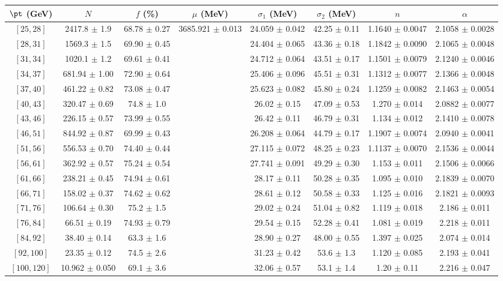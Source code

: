 \begin{tabular}{c||c|c|c|c|c|c|c}
$\pt$ (GeV) & $N$ & $f$ (\%) & $\mu$ (MeV) & $\sigma_1$ (MeV) & $\sigma_2$ (MeV) & $n$ & $\alpha$ \\
\hline
$[25, 28]$ & 2417.8 $\pm$ 1.9 & 68.78 $\pm$ 0.27 & \multirow{17}{*}{3685.921 $\pm$ 0.013} & 24.059 $\pm$ 0.042 & 42.25 $\pm$ 0.11 & 1.1640 $\pm$ 0.0047 & 2.1058 $\pm$ 0.0028\\
$[28, 31]$ & 1569.3 $\pm$ 1.5 & 69.90 $\pm$ 0.45 &  & 24.404 $\pm$ 0.065 & 43.36 $\pm$ 0.18 & 1.1842 $\pm$ 0.0090 & 2.1065 $\pm$ 0.0048\\
$[31, 34]$ & 1020.1 $\pm$ 1.2 & 69.61 $\pm$ 0.41 &  & 24.712 $\pm$ 0.064 & 43.51 $\pm$ 0.17 & 1.1501 $\pm$ 0.0079 & 2.1240 $\pm$ 0.0046\\
$[34, 37]$ & 681.94 $\pm$ 1.00 & 72.90 $\pm$ 0.64 &  & 25.406 $\pm$ 0.096 & 45.51 $\pm$ 0.31 & 1.1312 $\pm$ 0.0077 & 2.1366 $\pm$ 0.0048\\
$[37, 40]$ & 461.22 $\pm$ 0.82 & 73.08 $\pm$ 0.47 &  & 25.623 $\pm$ 0.082 & 45.80 $\pm$ 0.24 & 1.1259 $\pm$ 0.0082 & 2.1463 $\pm$ 0.0054\\
$[40, 43]$ & 320.47 $\pm$ 0.69 & 74.8 $\pm$ 1.0 &  & 26.02 $\pm$ 0.15 & 47.09 $\pm$ 0.53 & 1.270 $\pm$ 0.014 & 2.0882 $\pm$ 0.0077\\
$[43, 46]$ & 226.15 $\pm$ 0.57 & 73.99 $\pm$ 0.55 &  & 26.42 $\pm$ 0.11 & 46.79 $\pm$ 0.31 & 1.134 $\pm$ 0.012 & 2.1410 $\pm$ 0.0078\\
$[46, 51]$ & 844.92 $\pm$ 0.87 & 69.99 $\pm$ 0.43 &  & 26.208 $\pm$ 0.064 & 44.79 $\pm$ 0.17 & 1.1907 $\pm$ 0.0074 & 2.0940 $\pm$ 0.0041\\
$[51, 56]$ & 556.53 $\pm$ 0.70 & 74.40 $\pm$ 0.44 &  & 27.115 $\pm$ 0.072 & 48.25 $\pm$ 0.23 & 1.1137 $\pm$ 0.0070 & 2.1536 $\pm$ 0.0044\\
$[56, 61]$ & 362.92 $\pm$ 0.57 & 75.24 $\pm$ 0.54 &  & 27.741 $\pm$ 0.091 & 49.29 $\pm$ 0.30 & 1.153 $\pm$ 0.011 & 2.1506 $\pm$ 0.0066\\
$[61, 66]$ & 238.21 $\pm$ 0.45 & 74.94 $\pm$ 0.61 &  & 28.17 $\pm$ 0.11 & 50.28 $\pm$ 0.35 & 1.095 $\pm$ 0.010 & 2.1839 $\pm$ 0.0070\\
$[66, 71]$ & 158.02 $\pm$ 0.37 & 74.62 $\pm$ 0.62 &  & 28.61 $\pm$ 0.12 & 50.58 $\pm$ 0.33 & 1.125 $\pm$ 0.016 & 2.1821 $\pm$ 0.0093\\
$[71, 76]$ & 106.64 $\pm$ 0.30 & 75.2 $\pm$ 1.5 &  & 29.02 $\pm$ 0.24 & 51.04 $\pm$ 0.82 & 1.119 $\pm$ 0.018 & 2.186 $\pm$ 0.011\\
$[76, 84]$ & 66.51 $\pm$ 0.19 & 74.93 $\pm$ 0.79 &  & 29.54 $\pm$ 0.15 & 52.28 $\pm$ 0.41 & 1.081 $\pm$ 0.019 & 2.218 $\pm$ 0.011\\
$[84, 92]$ & 38.40 $\pm$ 0.14 & 63.3 $\pm$ 1.6 &  & 28.90 $\pm$ 0.27 & 48.00 $\pm$ 0.55 & 1.397 $\pm$ 0.025 & 2.074 $\pm$ 0.014\\
$[92, 100]$ & 23.35 $\pm$ 0.12 & 74.5 $\pm$ 2.6 &  & 31.23 $\pm$ 0.42 & 53.6 $\pm$ 1.3 & 1.120 $\pm$ 0.085 & 2.193 $\pm$ 0.041\\
$[100, 120]$ & 10.962 $\pm$ 0.050 & 69.1 $\pm$ 3.6 &  & 32.06 $\pm$ 0.57 & 53.1 $\pm$ 1.4 & 1.20 $\pm$ 0.11 & 2.216 $\pm$ 0.047\\
\end{tabular}
